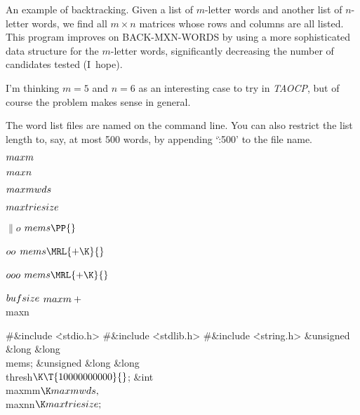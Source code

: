 

An example of backtracking. Given a list of $m$-letter words and
another
list of $n$-letter words, we find all $m\times n$ matrices whose rows and
columns are all listed. This program improves on {\mc BACK-MXN-WORDS}
by using a more sophisticated data structure for the $m$-letter words,
significantly decreasing the number of candidates tested (I~hope).

I'm thinking $m=5$ and $n=6$ as an interesting case to try in {\sl TAOCP},
but of course the problem makes sense in general.

The word list files are named on the command line. You can also restrict
the list length to, say, at most 500 words, by appending `\.{:500}' to
the file name.

\Y\B\4\D$\\{maxm}$ \5
\par
\B\4\D$\\{maxn}$ \5
\par
\B\4\D$\\{maxmwds}$ \5
\par
\B\4\D$\\{maxtriesize}$ \5
\par
\B\4\D$\|o$ \5
$\\{mems}\PP{}$\par
\B\4\D$\\{oo}$ \5
$\\{mems}\MRL{+{\K}}{}$\par
\B\4\D$\\{ooo}$ \5
$\\{mems}\MRL{+{\K}}{}$\par
\B\4\D$\\{bufsize}$ \5
$\\{maxm}+{}$\\{maxn}\par
\Y\B\8\#\&{include} \.{<stdio.h>}\6
\8\#\&{include} \.{<stdlib.h>}\6
\8\#\&{include} \.{<string.h>}\6
\&{unsigned} \&{long} \&{long} \\{mems};\6
\&{unsigned} \&{long} \&{long} \\{thresh}${}\K\T{10000000000}{}$;\6
\&{int} \\{maxmm}${}\K\\{maxmwds},{}$ \\{maxnn}${}\K\\{maxtriesize};{}$\6
